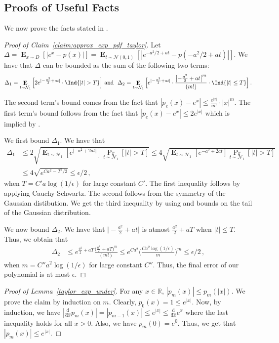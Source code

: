 \documentclass{theoretics}
\DeclareMathOperator*{\E}{\mathbf{E}}
\def\d{\mathrm{d}}
\newcommand{\R}{\mathbb{R}}
\newcommand{\1}{\Ind}
\newcommand{\Gauss}{\mathcal{N}}
\begin{document}
\subsection{Proofs of Useful Facts}
\label{subsec:proof_facts}
We now prove the facts stated in .

\begin{proof}[Proof of Claim~\ref{claim:approx_exp_pdf_taylor}]
Let $\Delta=\E_{x\sim D}[|e^{x}-p(x)|]=\E_{t\sim \Gauss(0,1)}[|e^{-a^2/2+a t}-p(-a^2/2+a t)|]$.
    We have that ${\Delta}$ can be bounded as the sum of the following two terms:
    \[
        \Delta_{1}=\E_{t\sim \Gauss_1}\Big[2e^{|-\frac{a^2}{2}+at|}\cdot  
    \1\{|t|> T\}\Big] \text{ and } 
            ~\Delta_{2}=\E_{t\sim \Gauss_1}\Big[e^{|-\frac{a^2}{2}+at|}\cdot \frac{\bigl|-\frac{a^2}{2}+at\bigr|^{m}}{(m!)}\cdot 
        \1\{|t|\leq  T\}\Big]\,.\]

        The second term's bound comes from the fact that $|p_e(x)-e^{x}|\leq \frac{e^{|x|}}{m!}\cdot |x|^{m}$.
        The first term's bound follows from the fact that $|p_e(x)-e^{x}|\leq 2e^{|x|}$ which is implied by .

    We first bound $\Delta_{1}$. We have that 
    \begin{align*}
        \Delta_{1}&\leq 2\sqrt{\E_{t\sim \Gauss_1}[e^{|-a^2+2at|}]\Pr_{t\sim \Gauss_1}[|t|>T]} 
        \leq 4\sqrt{\E_{t\sim \Gauss_1}[e^{-a^2+2at}]\Pr_{t\sim \Gauss_1}[|t|>T]}\\
    &\leq 4\sqrt{e^{Ca^2-T^2/2}}\leq \epsilon/2\,,
    \end{align*}
    when $T= C'a\log(1/\epsilon)$ for large constant $C'$. The first inequality follows by applying Cauchy-Schwartz. The second follows from the symmetry of the Gaussian distibution. We get the third inequality by using  and bounds on the tail of the Gaussian distribution. 
   
    
      We now bound $\Delta_{2}$. We have that $\bigl|-\frac{a^2}{2}+at\bigr|$ is atmost $\frac{a^2}{2}+aT$ when $|t|\leq T$. Thus, we obtain that 
      \begin{align*}
        \Delta_{2}&\leq e^{\frac{a^2}{2}+aT} \frac{\bigl(\frac{a^2}{2}+aT\bigr)^{m}}{(m!)}\leq e^{Ca^2}\biggl(\frac{Ca^2\log(1/\epsilon)}{m}\biggr)^{m}\leq \epsilon/2\,, 
        \end{align*} when $m=C''a^2\log(1/\epsilon)$ for large constant $C''$. Thus, the final error of our polynomial is at most $\epsilon$.
\end{proof}
\begin{proof}[Proof of Lemma~\ref{taylor_exp_under}]
\label{proof:taylor_exp_under}
    For any $x\in \R$, $|p_m(x)|\leq p_m(|x|)$.  We prove the claim by induction on $m$. Clearly, $p_0(x)=1\leq e^{|x|}$. Now, by induction, we have $|\frac{\d}{\d x}p_m(x)|=|p_{m-1}(x)|\leq e^{|x|} \leq \frac{\d}{\d x}e^{x}$ where the last inequality holds for all $x>0$. Also, we have $p_m(0)=e^{0}$. Thus, we get that $|p_m(x)|\leq e^{|x|}$.
\end{proof}
\end{document}
